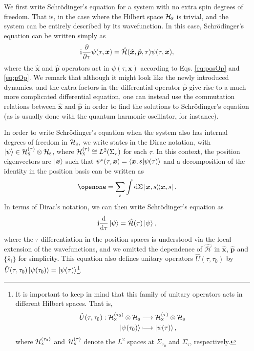 \documentclass[prd,twocolumn,superscriptaddress,floatfix,amsmath,amssymb,amsfonts,longbibliography,nofootinbib]{revtex4-1}
\newcommand{\ii}{\mathrm{i}}
\begin{document}
We first write Schr\"odinger's equation for a system with no extra spin degrees of freedom. That is, in the case where the Hilbert space $\mathcal{H}_\textsc{s}$ is trivial, and the system can be entirely described by its wavefunction. In this case, Schr\"odinger's equation can be written simply as
\begin{equation}
    \ii\pdv{}{\tau}\psi(\tau,\bm x) =\hat{\mathcal{H}}(\hat{\bm x},\hat{\bm p},\tau)\psi(\tau,\bm x),
\end{equation}
where the $\hat{\bm x}$ and $\hat{\bm p}$ operators act in $\psi(\tau,\bm x)$ according to Eqs. \eqref{eq:posOp} and \eqref{eq:pOp}. We remark that although it might look like the newly introduced dynamics, and the extra factors in the differential operator $\hat{\bm p}$ give rise to a much more complicated differential equation, one can instead use the commutation relations between $\hat{\bm x}$ and $\hat{\bm p}$ in order to find the solutions to Schr\"odinger's equation (as is usually done with the quantum harmonic oscillator, for instance).

In order to write Schr\"odinger's equation when the system also has internal degrees of freedom in $\mathcal{H}_\textsc{s}$, we write states in the Dirac notation, with \mbox{$\ket{\psi}\in \mathcal{H}^{(\tau)}_{\textsc{x}}\otimes \mathcal{H}_\textsc{s}$}, where $\mathcal{H}^{(\tau)}_{\textsc{x}}\cong L^2(\Sigma_\tau)$ for each $\tau$. In this context, the position eigenvectors are $\ket{\bm x}$ such that $\psi^s(\tau,\bm x) = \braket{\bm x,s}{\psi(\tau)}$ and a decomposition of the identity in the position basis can be written as
\begin{equation}\label{eq:idDecomp}
    \openone = \sum_s \int \dd \Sigma \ket{\bm x,s}\!\!\bra{\bm x,s}.
\end{equation}
In terms of Dirac's notation, we can then write Schr\"odinger's equation as
\begin{equation}
    \ii \dv{}{\tau}\ket{\psi} = \hat{\mathcal{H}}(\tau) \ket{\psi},
\end{equation}
where the $\tau$ differentiation in the position spaces is understood via the local extension of the wavefunctions, and we omitted the dependence of $\hat{\mathcal{H}}$ in $\hat{\bm x}$, $\hat{\bm p}$ and $\{\hat{s}_i\}$ for simplicity. This equation also defines unitary operators $\hat{U}(\tau,\tau_0)$ by $\hat{U}(\tau,\tau_0)\ket{\psi(\tau_0)} = \ket{\psi(\tau)}$\footnote{It is important to keep in mind that this family of unitary operators acts in different Hilbert spaces. That is,
\begin{align}
    \hat{U}(\tau,\tau_0): \mathcal{H}^{(\tau_0)}_{\textsc{x}}\otimes \mathcal{H}_\textsc{s}&\longrightarrow  \mathcal{H}^{(\tau)}_{\textsc{x}}\otimes \mathcal{H}_\textsc{s}\\
    \:\:\:\:\ket{\psi(\tau_0)}&\longmapsto \ket{\psi(\tau)},\nonumber
\end{align}
where $\mathcal{H}^{(\tau_0)}_{\textsc{x}}$ and $\mathcal{H}^{(\tau)}_{\textsc{x}}$ denote the $L^2$ spaces at $\Sigma_{\tau_0}$ and $\Sigma_\tau$, respectively.}.
\end{document}
